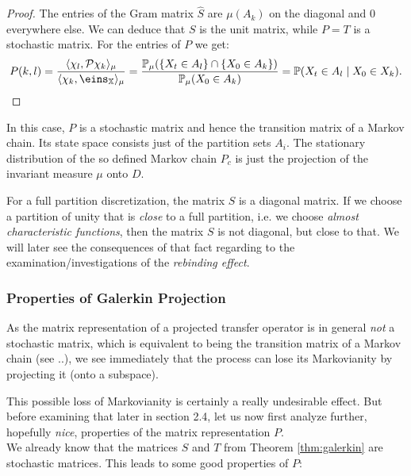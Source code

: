 \begin{proof}
The entries of the Gram matrix $\hat{S}$ are $\mu(A_k)$ on the diagonal and $0$ everywhere else.
We can deduce that $S$ is the unit matrix, while $P=T$ is a stochastic matrix. 
For the entries of $P$ we get:
\begin{equation*}
P(k,l)=
\frac{\langle \chi_l, \Pcal \chi_k \rangle_\mu}{\langle \chi_k, \eins_\X \rangle_\mu}
= \frac{\Prob_\mu (\{X_t \in A_l\} \cap \{X_0 \in A_k\})}{\Prob_\mu(X_0 \in A_k)}
= \Prob(X_t \in A_l \mid X_0 \in X_k).
\end{equation*}
\end{proof}

In this case, $P$ is a stochastic matrix and hence the transition matrix of a Markov chain. 
Its state space consists just of the partition sets $A_i$. The stationary distribution of the so defined Markov chain $P_c$ is just the projection of the invariant measure $\mu$ onto $D$. 

For a full partition discretization, the matrix $S$ is a diagonal matrix. If we choose a partition of unity that is \textit{close} to a full partition, i.e. we choose \textit{almost characteristic functions}, then the matrix $S$ is not diagonal, but close to that. We will later see the consequences of that fact regarding to the examination/investigations of the \textit{rebinding effect}.

\subsubsection*{Properties of Galerkin Projection}

As the matrix representation of a projected transfer operator is in general \textit{not} a stochastic matrix, which is equivalent to being the transition matrix of a Markov chain (see ..), we see immediately that the process can lose its Markovianity by projecting it (onto a subspace).

This possible loss of Markovianity is certainly a really undesirable effect. But before examining that later in section 2.4, let us now first analyze further, hopefully \textit{nice}, properties of the matrix representation $P$.
\\

We already know that the matrices $S$ and $T$ from Theorem \ref{thm:galerkin} are stochastic matrices. This leads to some good properties of $P$:

